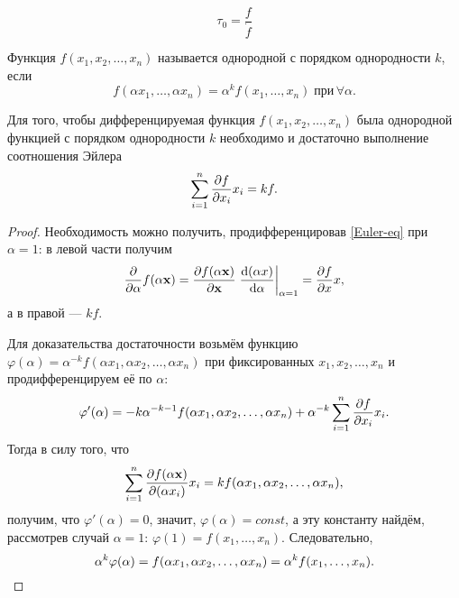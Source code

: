 \documentclass[12pt, a4paper]{article}
\begin{document}
\begin{dfn}
\begin{equation}
\tau_0 = \frac{f}{\dot{f}}
\end{equation}
\end{dfn}

\begin{dfn}
Функция $f(x_1, x_2, \dots, x_n)$ называется однородной с порядком однородности $k$, если
\begin{equation}
f(\alpha x_1, \dots, \alpha x_n) = \alpha^k f(x_1,  \dots, x_n) \; \text{при}\, \forall \alpha.
\end{equation}
\end{dfn}

\begin{lem}
Для того, чтобы дифференцируемая функция   $f(x_1 , x_2, \dots, x_n)$  была однородной функцией с порядком однородности   $k$ необходимо и достаточно выполнение соотношения Эйлера
\begin{equation}
\sum_{i=1}^n \pdv{f}{x_i} x_i = kf. \label{Euler-eq} 
\end{equation}
\end{lem}
\begin{proof}
Необходимость можно получить, продифференцировав \eqref{Euler-eq} при $\alpha = 1$: в левой части получим
\begin{equation*}
\pdv{\alpha} f(\alpha \vb{x}) = \pdv{f(\alpha \vb{x})}{\vb{x}} \left. \dv{(\alpha x)}{\alpha} \right|_{\alpha = 1} = \pdv{f}{x} x,
\end{equation*}
а в правой --- $kf$.

Для доказательства достаточности возьмём функцию   $ \varphi (\alpha)=\alpha ^{-k}f(\alpha x_{1},\alpha x_{2}, \dots ,\alpha x_{n})$ при фиксированных $x_1 , x_2, \dots, x_n$ и продифференцируем её по  $\alpha$: 
\begin{equation*}
\varphi'(\alpha) = - k \alpha^{-k-1} f(\alpha x_{1},\alpha x_{2}, \dots ,\alpha x_{n}) + \alpha ^{-k} \sum_{i=1}^n \pdv{f}{x_i} x_i.
\end{equation*}
Тогда в силу того, что 
\begin{equation*}
\sum_{i=1}^n \pdv{f(\alpha\vb{x})}{(\alpha x_i)} x_i = k f(\alpha x_{1},\alpha x_{2}, \dots ,\alpha x_{n}),
\end{equation*}
получим, что $\varphi'(\alpha) = 0$, значит, $\varphi(\alpha) = const$, а эту константу найдём, рассмотрев случай $\alpha =1$: $\varphi(1) = f(x_1,  \dots, x_n)$. Следовательно, 
\begin{equation*}
\alpha^k \varphi(\alpha) = f(\alpha x_{1},\alpha x_{2}, \dots ,\alpha x_{n}) = \alpha^k f(x_1,  \dots, x_n). \qedhere
\end{equation*}
\end{proof}
\end{document}
